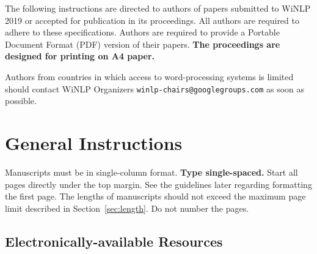\documentclass[11pt]{article}
\begin{document}
%
% 

The following instructions are directed to authors of papers submitted
to WiNLP 2019 or accepted for publication in its proceedings. All
authors are required to adhere to these specifications. Authors are
required to provide a Portable Document Format (PDF) version of their
papers. \textbf{The proceedings are designed for printing on A4
  paper.}

Authors from countries in which access to word-processing systems is
limited should contact WiNLP Organizers \texttt{winlp-chairs@googlegroups.com}
as soon as possible.

\section{General Instructions}

Manuscripts must be in single-column format. {\bf Type single-spaced.}  Start all
pages directly under the top margin. See the guidelines later
regarding formatting the first page. The lengths of manuscripts
should not exceed the maximum page limit described in Section~\ref{sec:length}.
Do not number the pages.


\subsection{Electronically-available Resources}
\end{document}
